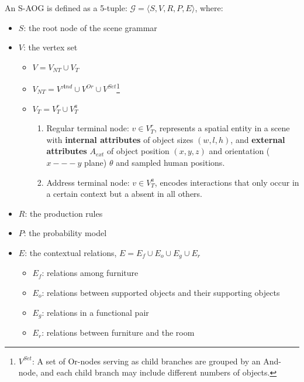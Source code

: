 \documentclass[10pt]{article}
\begin{document}
An S-AOG is defined as a 5-tuple: $\mathcal{G} = \langle S, V, R, P, E \rangle$,
where:
%
\begin{itemize}
  \item $S$: the root node of the scene grammar
  \item $V$: the vertex set
    \begin{itemize}
      \item $V = V_{NT} \cup V_T$
      \item $V_{NT} = V^{And} \cup V^{Or} \cup V^{Set}$\footnote{$V^{Set}$: A
          set of Or-nodes serving as child branches are grouped by an And-node,
          and each child branch may include different numbers of objects.}
      \item $V_T = V^r_T \cup V^a_T$
        \begin{enumerate}
          \item Regular terminal node: $v \in V^r_T$, represents a spatial
            entity in a scene with \textbf{internal attributes} of object sizes
            $(w, l, h)$, and \textbf{external attributes} $A_{ext}$ of
            object position $(x, y, z)$ and orientation ($x --- y$ plane)
            $\theta$ and sampled human positions.
          \item Address terminal node: $v \in V^a_T$, encodes interactions that
            only occur in a certain context but a absent in all others.
        \end{enumerate}
    \end{itemize}
  \item $R$: the production rules
  \item $P$: the probability model
  \item $E$: the contextual relations, $E = E_f \cup E_o \cup E_g \cup E_r$
    \begin{itemize}
      \item $E_f$: relations among furniture
      \item $E_o$: relations between supported objects and their supporting
        objects
      \item $E_g$: relations in a functional pair
      \item $E_r$: relations between furniture and the room
    \end{itemize}
\end{itemize}
\end{document}
